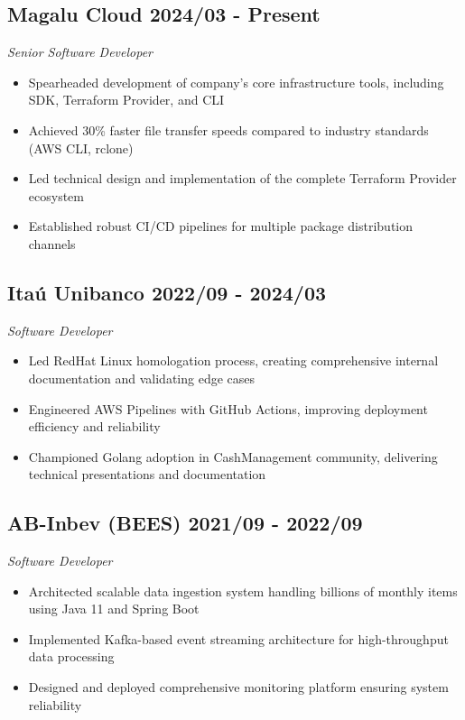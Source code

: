 \documentclass[a4paper,10pt]{article}
\begin{document}
\subsection*{\textcolor{primaryblue}{Magalu Cloud} \hfill 2024/03 - Present}
\textit{Senior Software Developer}
\begin{itemize}
    \item Spearheaded development of company's core infrastructure tools, including SDK, Terraform Provider, and CLI
    \item Achieved 30\% faster file transfer speeds compared to industry standards (AWS CLI, rclone)
    \item Led technical design and implementation of the complete Terraform Provider ecosystem
    \item Established robust CI/CD pipelines for multiple package distribution channels
\end{itemize}

\subsection*{\textcolor{primaryblue}{Itaú Unibanco} \hfill 2022/09 - 2024/03}
\textit{Software Developer}
\begin{itemize}
    \item Led RedHat Linux homologation process, creating comprehensive internal documentation and validating edge cases
    \item Engineered AWS Pipelines with GitHub Actions, improving deployment efficiency and reliability
    \item Championed Golang adoption in CashManagement community, delivering technical presentations and documentation
\end{itemize}

\subsection*{\textcolor{primaryblue}{AB-Inbev (BEES)} \hfill 2021/09 - 2022/09}
\textit{Software Developer}
\begin{itemize}
    \item Architected scalable data ingestion system handling billions of monthly items using Java 11 and Spring Boot
    \item Implemented Kafka-based event streaming architecture for high-throughput data processing
    \item Designed and deployed comprehensive monitoring platform ensuring system reliability
\end{itemize}
\end{document}
